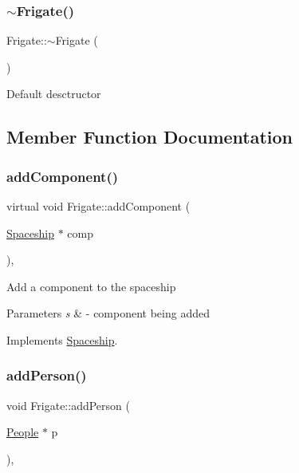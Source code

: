 \subsubsection{\texorpdfstring{$\sim$\+Frigate()}{~Frigate()}}
{\footnotesize\ttfamily Frigate\+::$\sim$\+Frigate (\begin{DoxyParamCaption}{ }\end{DoxyParamCaption})\hspace{0.3cm}{\ttfamily [inline]}}

Default desctructor 

\subsection{Member Function Documentation}
\mbox{\label{classFrigate_af1c809e79096219e53da2f577ec8178d}} 
\subsubsection{\texorpdfstring{add\+Component()}{addComponent()}}
{\footnotesize\ttfamily virtual void Frigate\+::add\+Component (\begin{DoxyParamCaption}\item[{\hyperlink{classSpaceship}{Spaceship} $\ast$}]{comp }\end{DoxyParamCaption})\hspace{0.3cm}{\ttfamily [inline]}, {\ttfamily [virtual]}}

Add a component to the spaceship 
\begin{DoxyParams}{Parameters}
{\em s} & -\/ component being added \\
\hline
\end{DoxyParams}


Implements \hyperlink{classSpaceship_ac1b4673a691cd100708ddea08cd9f192}{Spaceship}.

\mbox{\label{classFrigate_a5da866e084d1d07363f06ff052005b41}} 
\subsubsection{\texorpdfstring{add\+Person()}{addPerson()}}
{\footnotesize\ttfamily void Frigate\+::add\+Person (\begin{DoxyParamCaption}\item[{\hyperlink{classPeople}{People} $\ast$}]{p }\end{DoxyParamCaption})\hspace{0.3cm}{\ttfamily [inline]}, {\ttfamily [virtual]}}

